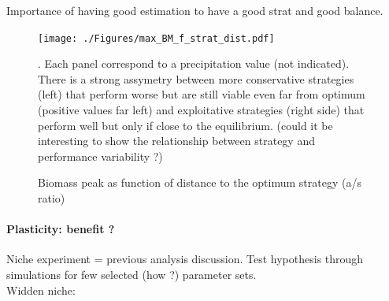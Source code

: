 \documentclass[review]{elsarticle}
\begin{document}
Importance of having good estimation to have a good strat and good balance.\\

\begin{figure}
\texttt{[image: ./Figures/max\_BM\_f\_strat\_dist.pdf]}
\caption{Biomass peak as function of distance to the optimum strategy (a/s ratio)}. Each panel correspond to a precipitation value (not indicated). There is a strong assymetry between more conservative strategies (left) that perform worse but are still viable even far from optimum (positive values far left) and exploitative strategies (right side) that perform well but only if close to the equilibrium. (could it be interesting to show the relationship between strategy and performance variability ?) 

\end{figure}

\paragraph{Plasticity: benefit ?}
Niche experiment = previous analysis discussion. Test hypothesis through simulations for few selected (how ?) parameter sets.\\
Widden niche:
\end{document}
